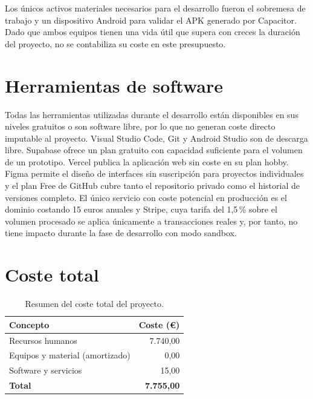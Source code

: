 Los únicos activos materiales necesarios para el desarrollo fueron el sobremesa de trabajo y un dispositivo Android para validar el APK generado por Capacitor. Dado que ambos equipos tienen una vida útil que supera con creces la duración del proyecto, no se contabiliza su coste en este presupuesto.

\section{Herramientas de software}
\label{sec:presupuesto_software}

Todas las herramientas utilizadas durante el desarrollo están disponibles en sus niveles gratuitos o son software libre, por lo que no generan coste directo imputable al proyecto. Visual Studio Code, Git y Android Studio son de descarga libre. Supabase ofrece un plan gratuito con capacidad suficiente para el volumen de un prototipo. Vercel publica la aplicación web sin coste en su plan hobby. Figma permite el diseño de interfaces sin suscripción para proyectos individuales y el plan Free de GitHub cubre tanto el repositorio privado como el historial de versiones completo. El único servicio con coste potencial en producción es el dominio costando 15 euros anuales y Stripe, cuya tarifa del 1,5\,\% sobre el volumen procesado se aplica únicamente a transacciones reales y, por tanto, no tiene impacto durante la fase de desarrollo con modo sandbox.

\section{Coste total}
\label{sec:presupuesto_total}

\begin{table}[!ht]
    \centering
    \caption{Resumen del coste total del proyecto.}
    \label{tbl:presupuesto_total}
    \begin{tabularx}{0.65\textwidth}{Xr}
        \toprule
        \textbf{Concepto}               & \textbf{Coste (€)} \\
        \midrule
        Recursos humanos                & 7.740,00           \\
        Equipos y material (amortizado) & 0,00               \\
        Software y servicios            & 15,00              \\
        \midrule
        \textbf{Total}                  & \textbf{7.755,00}  \\
        \bottomrule
    \end{tabularx}
\end{table}

